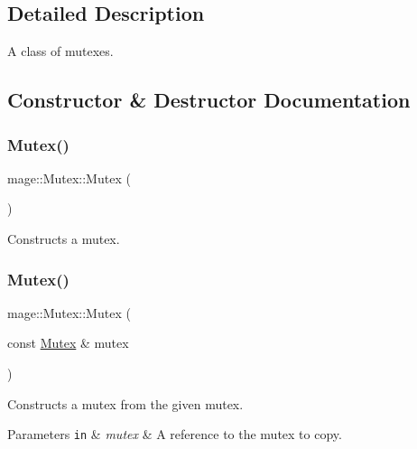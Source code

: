 \subsection{Detailed Description}
A class of mutexes. 

\subsection{Constructor \& Destructor Documentation}
\hypertarget{classmage_1_1_mutex_a7d91a1e59c8d99dfbe2087d3a4a4bf6a}{}\label{classmage_1_1_mutex_a7d91a1e59c8d99dfbe2087d3a4a4bf6a} 
\subsubsection{\texorpdfstring{Mutex()}{Mutex()}\hspace{0.1cm}{\footnotesize\ttfamily [1/3]}}
{\footnotesize\ttfamily mage\+::\+Mutex\+::\+Mutex (\begin{DoxyParamCaption}{ }\end{DoxyParamCaption})\hspace{0.3cm}{\ttfamily [noexcept]}}

Constructs a mutex. \hypertarget{classmage_1_1_mutex_af1c2c7d0134ba853903522d2f3684f22}{}\label{classmage_1_1_mutex_af1c2c7d0134ba853903522d2f3684f22} 
\subsubsection{\texorpdfstring{Mutex()}{Mutex()}\hspace{0.1cm}{\footnotesize\ttfamily [2/3]}}
{\footnotesize\ttfamily mage\+::\+Mutex\+::\+Mutex (\begin{DoxyParamCaption}\item[{const \hyperlink{classmage_1_1_mutex}{Mutex} \&}]{mutex }\end{DoxyParamCaption})\hspace{0.3cm}{\ttfamily [delete]}}

Constructs a mutex from the given mutex.


\begin{DoxyParams}[1]{Parameters}
\mbox{\tt in}  & {\em mutex} & A reference to the mutex to copy. \\
\hline
\end{DoxyParams}
\hypertarget{classmage_1_1_mutex_a0892548844c742d75942b3a4ee85a90d}{}\label{classmage_1_1_mutex_a0892548844c742d75942b3a4ee85a90d} 
